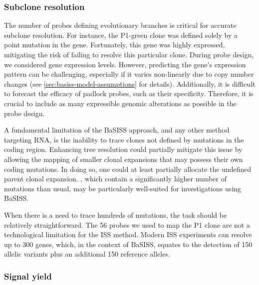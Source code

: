 \subsubsection*{Subclone resolution}
The number of probes defining evolutionary branches is critical for accurate subclone resolution. For instance, the P1-green clone was defined solely by a point mutation in the  gene. Fortunately, this gene was highly expressed, mitigating the risk of failing to resolve this particular clone. During probe design, we considered gene expression levels. However, predicting the gene's expression pattern can be challenging, especially if it varies non-linearly due to copy number changes (see \cref{sec:basiss-model-assumptions} for details). Additionally, it is difficult to forecast the efficacy of padlock probes, such as their specificity. Therefore, it is crucial to include as many expressible genomic alterations as possible in the probe design.

A fundamental limitation of the \ac{BaSISS} approach, and any other method targeting RNA, is the inability to trace clones not defined by mutations in the coding region. Enhancing tree resolution could partially mitigate this issue by allowing the mapping of smaller clonal expansions that may possess their own coding mutations. In doing so, one could at least partially allocate the undefined parent clonal expansion.  \parencite{Martincorena2015-br}, which contain a significantly higher number of mutations than usual, may be particularly well-suited for investigations using \ac{BaSISS}.

When there is a need to trace hundreds of mutations, the task should be relatively straightforward. The 56 probes we used to map the P1 clone are not a technological limitation for the \ac{ISS} method. Modern \ac{ISS} experiments can resolve up to 300 genes, which, in the context of \ac{BaSISS}, equates to the detection of 150 allelic variants plus an additional 150 reference alleles.

\subsubsection*{Signal yield}

